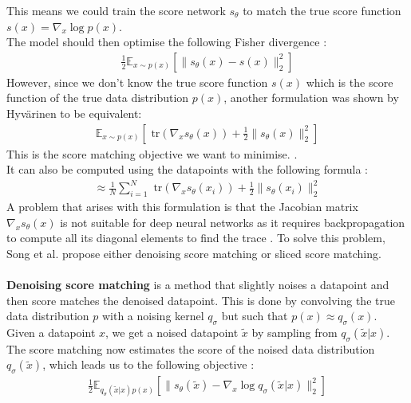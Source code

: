 \documentclass[twoside]{article}
\numberwithin{equation}{section}
\numberwithin{figure}{section}
\begin{document}
This means we could train the score network $s_\theta$ to match the true score function $s(x) = \nabla_x \log p(x)$. \\
The model should then optimise the following Fisher divergence \cite{hyvarinen2005, luo2022understanding}:
\begin{align}
  \frac{1}{2} \mathbb{E}_{x \sim p(x)} \left[ \| s_\theta (x) - s(x) \|_2^2 \right]
\end{align}
However, since we don't know the true score function $s(x)$ which is the score function of the true data distribution $p(x)$, another formulation was shown by Hyvärinen \cite{hyvarinen2005} to be equivalent: 
\begin{align}
  \mathbb{E}_{x \sim p(x)} \left[ \text{ tr}(\nabla_x s_\theta (x)) + \frac{1}{2} \| s_\theta (x) \|_2^2 \right]
\end{align}
This is the score matching objective we want to minimise. \cite{hyvarinen2005}. \\
It can also be computed using the datapoints with the following formula \cite{hyvarinen2005}:
\begin{align}
  \approx \frac{1}{N} \sum_{i=1}^N \text{ tr}(\nabla_x s_\theta (x_i)) + \frac{1}{2} \| s_\theta (x_i) \|_2^2
\end{align}
A problem that arises with this formulation is that the Jacobian matrix $\nabla_x s_\theta (x)$ is not suitable for deep neural networks as it requires backpropagation to compute all its diagonal elements to find the trace \cite{song2020generative, song2019sliced}. To solve this problem, Song et al. \cite{song2020generative} propose either denoising score matching or sliced score matching.
\\\\
\textbf{Denoising score matching} \cite{vincent2010denoising} is a method that slightly noises a datapoint and then score matches the denoised datapoint. This is done by convolving the true data distribution $p$ with a noising kernel $q_\sigma$ but such that $p(x) \approx q_\sigma (x)$. Given a datapoint $x$, we get a noised datapoint $\tilde{x}$ by sampling from $q_\sigma(\tilde{x} | x)$. \\
The score matching now estimates the score of the noised data distribution $q_\sigma(\tilde{x})$, which leads us to the following objective \cite{song2020generative, vincent2010denoising}:
\begin{align}
  \frac{1}{2} \mathbb{E}_{q_\sigma(\tilde{x} | x) p(x)} \left[ \| s_\theta (\tilde{x}) - \nabla_x \log q_\sigma(\tilde{x} | x) \|_2^2 \right]
\end{align}
\end{document}
